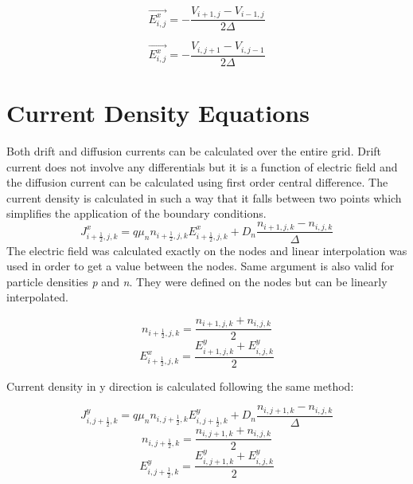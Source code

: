 \begin{doublespace}
\begin{equation}
\vec{E^x_{i,j}}=-\frac{V_{i+1,j}-V_{i-1,j}}{2\Delta}
\end{equation}

\begin{equation}
\vec{E^x_{i,j}}=-\frac{V_{i,j+1}-V_{i,j-1}}{2\Delta}
\end{equation}

\clearpage
\section{Current Density Equations}
 Both drift and diffusion currents can be calculated over the entire grid. Drift current does not involve any differentials but it is a function of electric field and the diffusion current can be calculated using first order central difference. The current density is calculated in such a way that it falls between two points which simplifies the application of the boundary conditions.
\begin{equation}
J^x_{i+\frac{1}{2},j,k}=q\mu_n n_{i+\frac{1}{2},j,k} E^x_{i+\frac{1}{2},j,k}+D_n \frac{n_{i+1,j,k}-n_{i,j,k}}{\Delta}
\end{equation}
The electric field was calculated exactly on the nodes and linear interpolation was used in order to get a value between the nodes. Same argument is also valid for particle densities \textit{p} and \textit{n}. They were defined on the nodes but can be linearly interpolated.

\begin{equation}\nonumber
n_{i+\frac{1}{2},j,k}=\frac{n_{i+1,j,k}+n_{i,j,k}}{2}
\end{equation}
\begin{equation}\nonumber
E^{x}_{i+\frac{1}{2},j,k}=\frac{E^y_{i+1,j,k}+E^y_{i,j,k}}{2}
\end{equation}

Current density in y direction is calculated following the same method:

\begin{equation}
J^y_{i,j+\frac{1}{2},k}=q\mu_n n_{i,j+\frac{1}{2},k} E^y_{i,j+\frac{1}{2},k}+D_n \frac{n_{i,j+1,k}-n_{i,j,k}}{\Delta}
\end{equation}
\begin{equation}\nonumber
n_{i,j+\frac{1}{2},k}=\frac{n_{i,j+1,k}+n_{i,j,k}}{2}
\end{equation}
\begin{equation}\nonumber
E^{y}_{i,j+\frac{1}{2},k}=\frac{E^y_{i,j+1,k}+E^y_{i,j,k}}{2}
\end{equation}


\end{doublespace}
